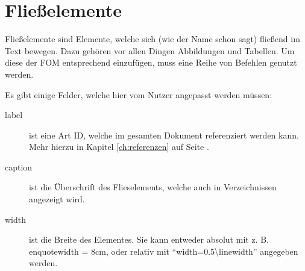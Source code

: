 \chapter{Fließelemente}
\label{ch:fliesselemente}
Fließelemente sind Elemente, welche sich (wie der Name schon sagt) fließend im Text bewegen. Dazu gehören vor allen Dingen Abbildungen und Tabellen. Um diese der FOM entsprechend einzufügen, muss eine Reihe von Befehlen genutzt werden.

Es gibt einige Felder, welche hier vom Nutzer angepasst werden müssen:
\begin{description}
\item[label]
ist eine Art ID, welche im gesamten Dokument referenziert werden kann. Mehr hierzu in Kapitel \ref{ch:referenzen} auf Seite \pageref{ch:referenzen}.
\item[caption] ist die Überschrift des Flieselements, welche auch in Verzeichnissen angezeigt wird.
\item[width] ist die Breite des Elementes. Sie kann entweder absolut mit z. B. enquote{width = 8cm}, oder relativ mit \enquote{width=0.5\textbackslash linewidth} angegeben werden.
\end{description}

